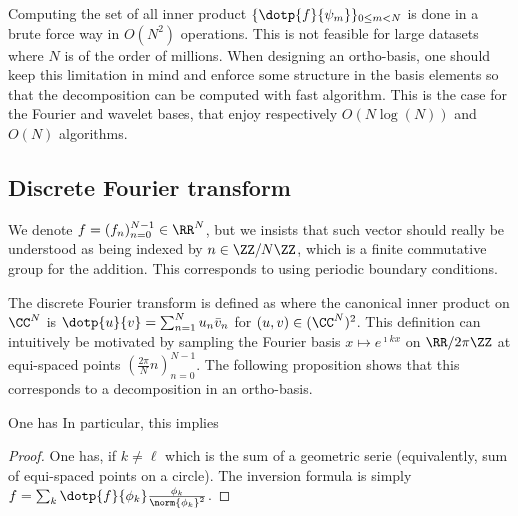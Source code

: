 Computing the set of all inner product $\{\dotp{f}{\psi_m}\}_{0 \leq m < N}$ is done in a brute force way in $O(N^2)$ operations.
This is not feasible for large datasets where $N$ is of the order of millions. When designing an ortho-basis, one should keep this limitation in mind and enforce some structure in the basis elements so that the decomposition can be computed with fast algorithm. This is the case for the Fourier and wavelet bases, that enjoy respectively $O(N\log(N))$ and $O(N)$ algorithms.


\subsection{Discrete Fourier transform}

We denote $f = (f_n)_{n=0}^{N-1} \in \RR^N$, but we insists that such vector should really be understood as being indexed by $n \in \ZZ/N\ZZ$, which is a finite commutative group for the addition. This corresponds to using periodic boundary conditions. 

The discrete Fourier transform is defined as
where the canonical inner product on $\CC^N$ is $\dotp{u}{v}=\sum_{n=1}^N u_n \bar v_n$ for $(u,v) \in (\CC^N)^2$.
%
This definition can intuitively be motivated by sampling the Fourier basis $x \mapsto e^{\imath k x}$ on $\RR/2\pi\ZZ$ at equi-spaced points $( \frac{2\pi}{N}n )_{n=0}^{N-1}$.
%
The following proposition shows that this corresponds to a decomposition in an ortho-basis.

\begin{prop}
	One has
	In particular, this implies
\end{prop}
\begin{proof}
	One has, if $k \neq \ell$
	which is the sum of a geometric serie (equivalently, sum of equi-spaced points on a circle). 
	The inversion formula is simply $f = \sum_k \dotp{f}{\phi_k} \frac{\phi_k}{\norm{\phi_k}^2}$.
\end{proof}


